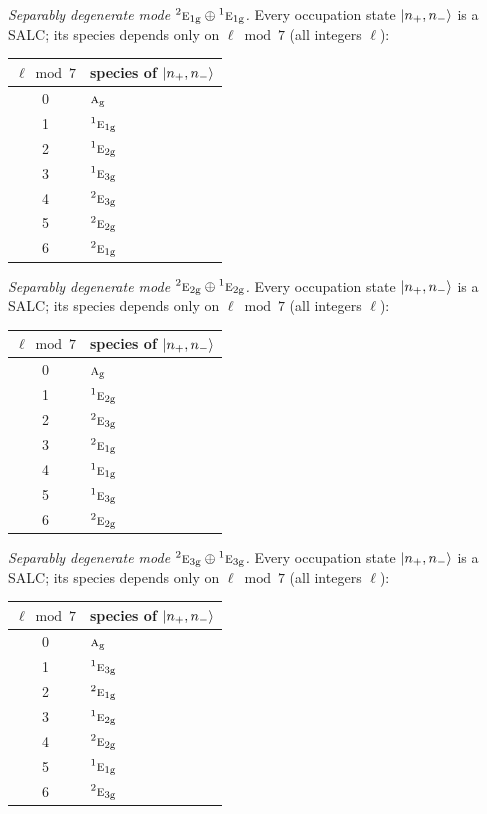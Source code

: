 \documentclass[11pt]{article}
\newcommand{\irr}[1]{\text{\normalfont\scshape #1}}
\newcommand{\conjpair}[1]{{}^{#1}}
\newcommand{\ptag}[1]{\mathrm{#1}}
\begin{document}
\emph{Separably degenerate mode $\conjpair{2}\irr{e}_{1\ptag{g}}\oplus \conjpair{1}\irr{e}_{1\ptag{g}}$.} Every occupation state $\ket{n_+,n_-}$ is a SALC; its species depends only on $\ell\bmod 7$ (all integers $\ell$):
\begin{longtable}{c l}\hline $\ell\bmod 7$ & species of $\ket{n_+,n_-}$\\ \hline\endhead
0 & $\irr{a}_{\ptag{g}}$\\
1 & $\conjpair{1}\irr{e}_{1\ptag{g}}$\\
2 & $\conjpair{1}\irr{e}_{2\ptag{g}}$\\
3 & $\conjpair{1}\irr{e}_{3\ptag{g}}$\\
4 & $\conjpair{2}\irr{e}_{3\ptag{g}}$\\
5 & $\conjpair{2}\irr{e}_{2\ptag{g}}$\\
6 & $\conjpair{2}\irr{e}_{1\ptag{g}}$\\
\hline\end{longtable}

\emph{Separably degenerate mode $\conjpair{2}\irr{e}_{2\ptag{g}}\oplus \conjpair{1}\irr{e}_{2\ptag{g}}$.} Every occupation state $\ket{n_+,n_-}$ is a SALC; its species depends only on $\ell\bmod 7$ (all integers $\ell$):
\begin{longtable}{c l}\hline $\ell\bmod 7$ & species of $\ket{n_+,n_-}$\\ \hline\endhead
0 & $\irr{a}_{\ptag{g}}$\\
1 & $\conjpair{1}\irr{e}_{2\ptag{g}}$\\
2 & $\conjpair{2}\irr{e}_{3\ptag{g}}$\\
3 & $\conjpair{2}\irr{e}_{1\ptag{g}}$\\
4 & $\conjpair{1}\irr{e}_{1\ptag{g}}$\\
5 & $\conjpair{1}\irr{e}_{3\ptag{g}}$\\
6 & $\conjpair{2}\irr{e}_{2\ptag{g}}$\\
\hline\end{longtable}

\emph{Separably degenerate mode $\conjpair{2}\irr{e}_{3\ptag{g}}\oplus \conjpair{1}\irr{e}_{3\ptag{g}}$.} Every occupation state $\ket{n_+,n_-}$ is a SALC; its species depends only on $\ell\bmod 7$ (all integers $\ell$):
\begin{longtable}{c l}\hline $\ell\bmod 7$ & species of $\ket{n_+,n_-}$\\ \hline\endhead
0 & $\irr{a}_{\ptag{g}}$\\
1 & $\conjpair{1}\irr{e}_{3\ptag{g}}$\\
2 & $\conjpair{2}\irr{e}_{1\ptag{g}}$\\
3 & $\conjpair{1}\irr{e}_{2\ptag{g}}$\\
4 & $\conjpair{2}\irr{e}_{2\ptag{g}}$\\
5 & $\conjpair{1}\irr{e}_{1\ptag{g}}$\\
6 & $\conjpair{2}\irr{e}_{3\ptag{g}}$\\
\hline\end{longtable}
\end{document}
